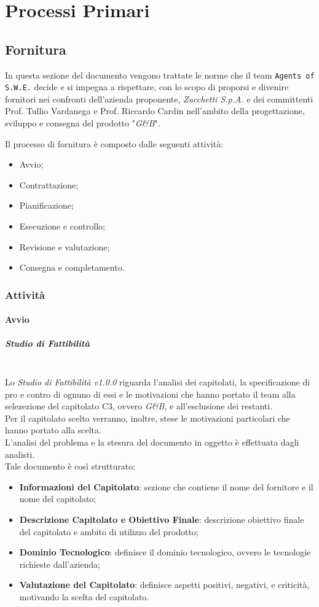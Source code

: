 \section{Processi Primari}\label{ProcessiPrimari}

\subsection{Fornitura}\label{Fornitura}
In questa sezione del documento vengono trattate le norme che il team \texttt{Agents of S.W.E.} decide e si impegna a rispettare, con lo scopo di proporsi e divenire fornitori nei confronti dell'azienda proponente, \textit{Zucchetti S.p.A.} e dei committenti Prof. Tullio Vardanega e Prof. Riccardo Cardin nell'ambito della progettazione, sviluppo e consegna del prodotto "\textit{G\&B}".

Il processo di fornitura è composto dalle seguenti attività:
\begin{itemize}
	\item Avvio;
	\item Contrattazione;
	\item Pianificazione;
	\item Esecuzione e controllo;
	\item Revisione e valutazione;
	\item Consegna e completamento.
\end{itemize}


\subsubsection{Attività}
\paragraph{Avvio} 
\subparagraph{Studio di Fattibilità} \-\\
Lo \textit{Studio di Fattibilità v1.0.0} riguarda l'analisi dei capitolati, la specificazione di pro e contro di ognuno di essi e le motivazioni che hanno portato il team alla selezezione del capitolato C3, ovvero \textit{G\&B}, e all'esclusione dei restanti.\\
Per il capitolato scelto verranno, inoltre, stese le motivazioni particolari che hanno portato alla scelta.\\
L'analisi del problema e la stesura del documento in oggetto è effettuata dagli analisti.\\
Tale documento è così strutturato:
\begin{itemize}
	\item \textbf{Informazioni del Capitolato}: sezione che contiene il nome del fornitore e il nome del capitolato;
	\item \textbf{Descrizione Capitolato e Obiettivo Finale}: descrizione obiettivo finale del capitolato e ambito di utilizzo del prodotto;
	\item \textbf{Dominio Tecnologico}: definisce il dominio tecnologico, ovvero le tecnologie richieste dall'azienda;
	\item \textbf{Valutazione del Capitolato}: definisce aspetti positivi, negativi, e criticità, motivando la scelta del capitolato.
\end{itemize}

